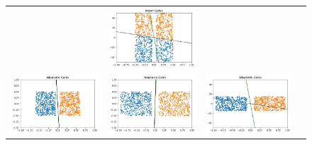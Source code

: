 \begin{figure}[!b]
\begin{minipage}{0.8\columnwidth}
{\begin{tabular}{cccc}
&
\includegraphics[scale=0.2]{figs/simple.png}
&
\\
\includegraphics[scale=0.2]{figs/adapt-1e2.png}
&
\includegraphics[scale=0.2]{figs/adapt-1e3.png}
&
\includegraphics[scale=0.2]{figs/adapt.png}
&
\end{tabular}
}
\end{minipage}


\end{figure}
